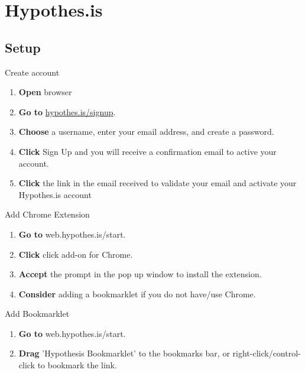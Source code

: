 \documentclass[10pt,a4paper]{article}
\begin{document}


\section{Hypothes.is}
\subsection{Setup}

\begin{textbox}{Create account}
 

  

\begin{enumerate}
\item \textbf{Open} browser
\item \textbf{Go to} \href{hypothes.is/signup}{hypothes.is/signup}. 
\item \textbf{Choose} a username, enter your email address, and create a password.
\item \textbf{Click} Sign Up and you will receive a confirmation email to active your account.
\item \textbf{Click} the link in the email received to validate your email and activate your Hypothes.is account
\end{enumerate}

\end{textbox}

\begin{textbox}{Add Chrome Extension}
 

  

\begin{enumerate}
\item \textbf{Go to} web.hypothes.is/start. 
\item \textbf{Click} click add-on for Chrome.
\item \textbf{Accept} the prompt in the pop up window to install the extension. 
\item \textbf{Consider} adding a bookmarklet if you do not have/use Chrome.
\end{enumerate}

\end{textbox}

\begin{textbox}{Add Bookmarklet}
 

  

\begin{enumerate}
\item \textbf{Go to} web.hypothes.is/start. 
\item \textbf{Drag} 'Hypothesis Bookmarklet' to the bookmarks bar, or right-click/control-click to bookmark the link.
\end{enumerate}

\end{textbox}
\end{document}
